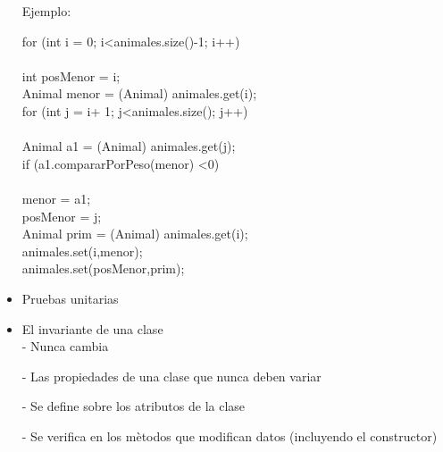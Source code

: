 \documentclass[12pt]{article}
\begin{document}
\begin{itemize}
    Ejemplo:

    for (int i = 0; i<animales.size()-1; i++)\\
    {\\
     int posMenor = i;\\
     Animal menor = (Animal) animales.get(i);\\

     for (int j = i+ 1; j<animales.size(); j++)\\
     {\\
      Animal a1 = (Animal) animales.get(j);\\
      
      if (a1.compararPorPeso(menor) <0)\\
      {\\
       menor = a1;\\
       posMenor = j;\\
      }
     }
     Animal prim = (Animal) animales.get(i);\\
     animales.set(i,menor);\\
     animales.set(posMenor,prim);\\
    }

     


 \item Pruebas unitarias\\

 \item El invariante de una clase\\
 - Nunca cambia
  
 - Las propiedades de una clase que nunca deben variar
 
 - Se define sobre los atributos de la clase
 
 - Se verifica en los mètodos que modifican datos (incluyendo el constructor)

\end{itemize}
\end{document}
